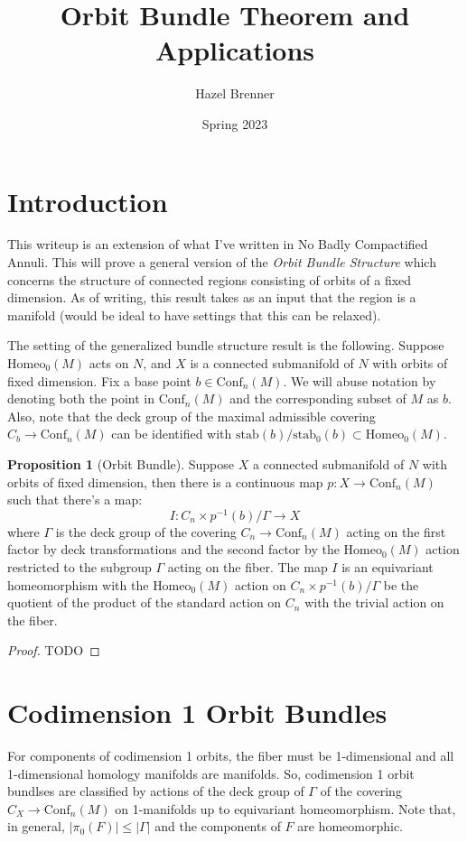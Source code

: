\documentclass[10pt, oneside]{article}
\title{Orbit Bundle Theorem and Applications}
\author{Hazel Brenner}
\date{Spring 2023}
\newcommand{\homeo}[1][S^1]{\text{Homeo}_0(#1)}
\newcommand{\conf}[2][S^1]{\text{Conf}_{#2}(#1)}
\theoremstyle{definition}
\newtheorem{prop}{Proposition}[section]
\theoremstyle{definition}
\begin{document}
\maketitle

\section{Introduction}
This writeup is an extension of what I've written in No Badly Compactified Annuli. This will prove a general version of the {\it Orbit Bundle Structure} which concerns the structure of connected regions consisting of orbits of a fixed dimension. As of writing, this result takes as an input that the region is a manifold (would be ideal to have settings that this can be relaxed). 

The setting of the generalized bundle structure result is the following.  Suppose $\homeo[M]$ acts on $N$, and $X$ is a connected submanifold of $N$ with orbits of fixed dimension. Fix a base point $b\in \conf[M]{n}$. We will abuse notation by denoting both the point in $\conf[M]{n}$ and the corresponding subset of $M$ as $b$. Also, note that the deck group of the maximal admissible covering $C_b \to \conf[M]{n}$ can be identified with $\text{stab}(b)/\text{stab}_0(b)\subset\homeo[M]$.

\begin{prop}[Orbit Bundle]
    Suppose $X$ a connected submanifold of $N$ with orbits of fixed dimension, then there is a continuous map $p: X\to \conf[M]{n}$ such that there's a map: $$I: C_n \times p^{-1}(b) / \Gamma \to X$$
    where $\Gamma$ is the deck group of the covering $C_n \to \conf[M]{n}$ acting on the first factor by deck transformations and the second factor by the $\homeo[M]$ action restricted to the subgroup $\Gamma$ acting on the fiber. The map $I$ is an equivariant homeomorphism with the $\homeo[M]$ action on $C_n \times p^{-1}(b) / \Gamma$ be the quotient of the product of the standard action on $C_n$ with the trivial action on the fiber.
\end{prop}
\begin{proof}
    TODO
\end{proof}

\section{Codimension 1 Orbit Bundles}
For components of codimension 1 orbits, the fiber must be 1-dimensional and all 1-dimensional homology manifolds are manifolds. So, codimension 1 orbit bundlses are classified by actions of the deck group of $\Gamma$ of the covering $C_X \to \conf[M]{n}$ on 1-manifolds up to equivariant homeomorphism. Note that, in general, $\lvert \pi_0(F) \rvert \leq \lvert \Gamma \rvert$ and the components of $F$ are homeomorphic. 
\end{document}
